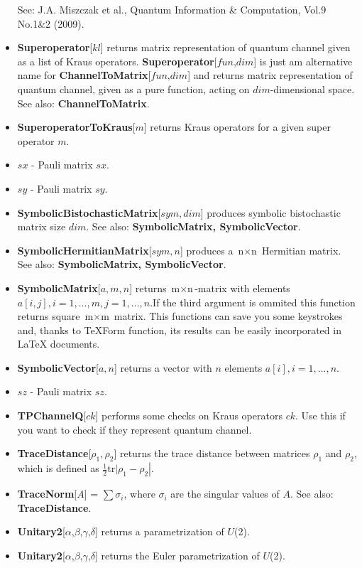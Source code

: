\documentclass[a4paper,10pt]{scrartcl}
\begin{document}
\begin{itemize}
See: J.A. Miszczak et al., Quantum Information \& Computation, Vol.9 No.1\&2 (2009).
\item  \textbf{Superoperator}[$kl$] returns matrix representation of quantum channel given as a list of Kraus operators. \textbf{Superoperator}[$fun$,$dim$] is just am alternative name for \textbf{ChannelToMatrix}[$fun$,$dim$] and returns matrix representation of quantum channel, given as a pure function, acting on $dim$-dimensional space. See also: \textbf{ChannelToMatrix}.
\item  \textbf{SuperoperatorToKraus}[$m$] returns Kraus operators for a given super operator $m$.
\item  $sx$ - Pauli matrix $sx$.
\item  $sy$ - Pauli matrix $sy$.
\item  \textbf{SymbolicBistochasticMatrix}[$sym, dim$] produces symbolic bistochastic matrix size $dim$. See also: \textbf{SymbolicMatrix, SymbolicVector}.
\item  \textbf{SymbolicHermitianMatrix}[$sym,n$] produces a $\text{n$\times $n}$ Hermitian matrix. See also: \textbf{SymbolicMatrix, SymbolicVector}.
\item  \textbf{SymbolicMatrix}[$a,m,n$] returns $\text{m$\times $n}$-matrix with elements $a[i,j], i=1,...,m, j=1,...,n$.If the third argument is ommited this function returns square $\text{m$\times $m}$ matrix. This functions can save you some keystrokes and, thanks to TeXForm function, its results can be easily incorporated in LaTeX documents.
\item  \textbf{SymbolicVector}[$a,n$] returns a vector with $n$ elements $a[i],i=1,...,n$.
\item  $sz$ - Pauli matrix $sz$.
\item  \textbf{TPChannelQ}[$ck$] performs some checks on Kraus operators $ck$. Use this if you want to check if they represent quantum channel.
\item  \textbf{TraceDistance}[$\rho _1,\rho _2$] returns the trace distance between matrices $\rho _1$ and $\rho _2$, which is defined as $\left.\frac{1}{2}\text{tr$|$}\rho _1-\rho _2\right|$.
\item  \textbf{TraceNorm}[$A$] = $\sum \sigma _i$, where $\sigma _i$ are the singular values of $A$. See also: \textbf{TraceDistance}.
\item  \textbf{Unitary2}[$\alpha$,$\beta$,$\gamma$,$\delta$] returns a parametrization of $U$(2).
\item  \textbf{Unitary2}[$\alpha$,$\beta$,$\gamma$,$\delta$] returns the Euler parametrization of $U$(2).

\end{itemize}
\end{document}
